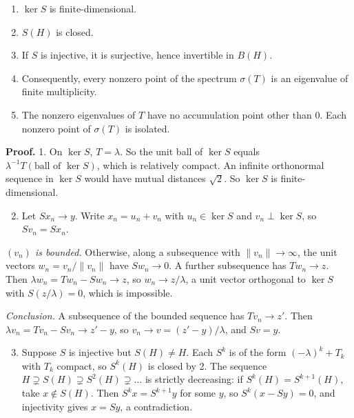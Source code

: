 \documentclass[
  english,
  11pt,
  a4paper,
]{article}
\providecommand{\tightlist}{%
  \setlength{\itemsep}{0pt}\setlength{\parskip}{0pt}}
\begin{document}
\begin{enumerate}
\tightlist
\item
  \(\ker S\) is finite-dimensional.
\item
  \(S(H)\) is closed.
\item
  If \(S\) is injective, it is surjective, hence invertible in \(B(H)\).
\item
  Consequently, every nonzero point of the spectrum \(\sigma(T)\) is an
  eigenvalue of finite multiplicity.
\item
  The nonzero eigenvalues of \(T\) have no accumulation point other than
  \(0\). Each nonzero point of \(\sigma(T)\) is isolated.
\end{enumerate}

\textbf{Proof.} 1. On \(\ker S\), \(T=\lambda\). So the unit ball of
\(\ker S\) equals \(\lambda^{-1}T(\text{ball of }\ker S)\), which is
relatively compact. An infinite orthonormal sequence in \(\ker S\) would
have mutual distances \(\sqrt2\). So \(\ker S\) is finite-dimensional.

\begin{enumerate}
\setcounter{enumi}{1}
\tightlist
\item
  Let \(Sx_n\to y\). Write \(x_n=u_n+v_n\) with \(u_n\in\ker S\) and
  \(v_n\perp\ker S\), so \(Sv_n=Sx_n\).
\end{enumerate}

\emph{\((v_n)\) is bounded.} Otherwise, along a subsequence with
\(\|v_n\|\to\infty\), the unit vectors \(w_n=v_n/\|v_n\|\) have
\(Sw_n\to0\). A further subsequence has \(Tw_n\to z\). Then
\(\lambda w_n=Tw_n-Sw_n\to z\), so \(w_n\to z/\lambda\), a unit vector
orthogonal to \(\ker S\) with \(S(z/\lambda)=0\), which is impossible.

\emph{Conclusion.} A subsequence of the bounded sequence has
\(Tv_n\to z'\). Then \(\lambda v_n=Tv_n-Sv_n\to z'-y\), so
\(v_n\to v=(z'-y)/\lambda\), and \(Sv=y\).

\begin{enumerate}
\setcounter{enumi}{2}
\tightlist
\item
  Suppose \(S\) is injective but \(S(H)\ne H\). Each \(S^k\) is of the
  form \((-\lambda)^k+T_k\) with \(T_k\) compact, so \(S^k(H)\) is
  closed by 2. The sequence
  \(H\supsetneq S(H)\supsetneq S^2(H)\supsetneq\dots\) is strictly
  decreasing: if \(S^k(H)=S^{k+1}(H)\), take \(x\notin S(H)\). Then
  \(S^kx=S^{k+1}y\) for some \(y\), so \(S^k(x-Sy)=0\), and injectivity
  gives \(x=Sy\), a contradiction.
\end{enumerate}
\end{document}
